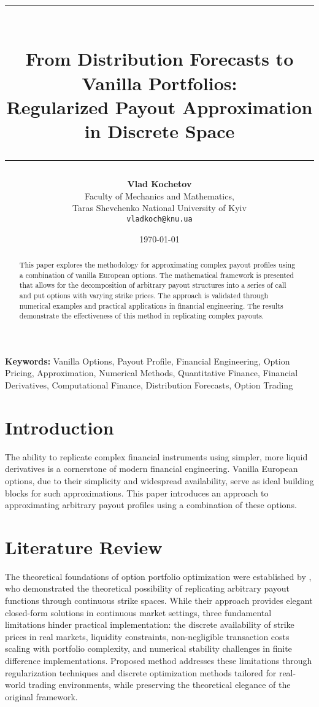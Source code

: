 \documentclass[12pt]{article}
\title{\rule{\textwidth}{4pt}\\[1em]
\textbf{From Distribution Forecasts to Vanilla Portfolios: \\[0.2cm]
Regularized Payout Approximation in Discrete Space}\\[1em]
\rule{\textwidth}{2pt}}
\author{\small \textbf{Vlad Kochetov} \\
    \small Faculty of Mechanics and Mathematics, \\
    \small Taras Shevchenko National University of Kyiv \\
    \small \texttt{vladkoch@knu.ua}
}
\date{\today}
\providecommand{\keywords}[1]{\textbf{Keywords:} #1}
\begin{document}
\thispagestyle{empty}

\maketitle

\begin{abstract}
This paper explores the methodology for approximating complex payout profiles using a
combination of vanilla European options. The mathematical framework is presented that
allows for the decomposition of arbitrary payout structures into a series of call and
put options with varying strike prices. The approach is validated through numerical
examples and practical applications in financial engineering. The results demonstrate
the effectiveness of this method in replicating complex payouts.
\end{abstract}

\newpage

\keywords{
    \small{
        Vanilla Options, 
        Payout Profile, 
        Financial Engineering, 
        Option Pricing, 
        Approximation, 
        Numerical Methods,
        Quantitative Finance,
        Financial Derivatives,
        Computational Finance,
        Distribution Forecasts,
        Option Trading
    }
}

\section{Introduction}
The ability to replicate complex financial instruments using simpler, more liquid
derivatives is a cornerstone of modern financial engineering. Vanilla European 
options, due to their simplicity and widespread availability, serve as ideal 
building blocks for such approximations. This paper introduces an approach to 
approximating arbitrary payout profiles using a combination of these options.

\section{Literature Review}
The theoretical foundations of option portfolio optimization were established by 
\cite{Carr01012001}, who demonstrated the theoretical possibility of replicating 
arbitrary payout functions through continuous strike spaces. While their approach 
provides elegant closed-form solutions in continuous market settings, three fundamental 
limitations hinder practical implementation: the discrete availability of strike prices 
in real markets, liquidity constraints, non-negligible transaction costs scaling with 
portfolio complexity, and numerical stability challenges in finite difference implementations. 
Proposed method addresses these limitations through regularization techniques and 
discrete optimization methods tailored for real-world trading environments, while 
preserving the theoretical elegance of the original framework.
\end{document}
